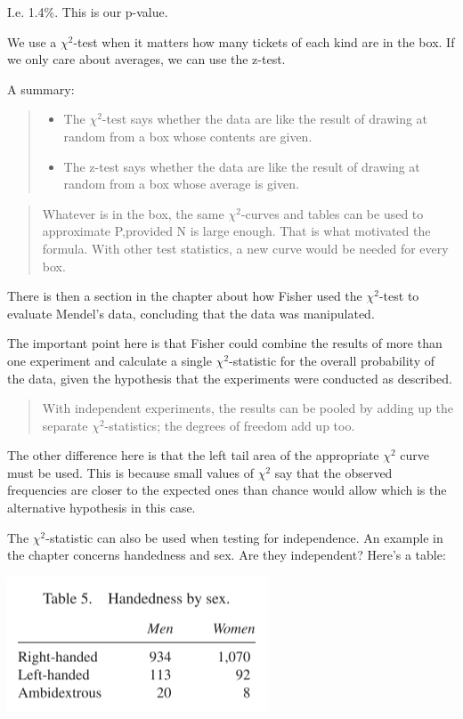 \documentclass[
]{book}
\providecommand{\tightlist}{%
  \setlength{\itemsep}{0pt}\setlength{\parskip}{0pt}}
\begin{document}
I.e. 1.4\%. This is our p-value.

We use a \(\chi^2\)-test when it matters how many tickets of each kind are in the box. If we only care about averages, we can use the z-test.

A summary:

\begin{quote}
\begin{itemize}
\tightlist
\item
  The \(\chi^2\)-test says whether the data are like the result of drawing at random from a box whose contents are given.
\item
  The z-test says whether the data are like the result of drawing at random from a box whose average is given.
\end{itemize}
\end{quote}

\begin{quote}
Whatever is in the box, the same \(\chi^2\)-curves and tables can be used to approximate P,provided N is large enough. That is what motivated the formula. With other test statistics, a new curve would be needed for every box.
\end{quote}

There is then a section in the chapter about how Fisher used the \(\chi^2\)-test to evaluate Mendel's data, concluding that the data was manipulated.

The important point here is that Fisher could combine the results of more than one experiment and calculate a single \(\chi^2\)-statistic for the overall probability of the data, given the hypothesis that the experiments were conducted as described.

\begin{quote}
With independent experiments, the results can be pooled by adding up the separate \(\chi^2\)-statistics; the degrees of freedom add up too.
\end{quote}

The other difference here is that the left tail area of the appropriate \(\chi^2\) curve must be used. This is because small values of \(\chi^2\) say that the observed frequencies are closer to the expected ones than chance would allow which is the alternative hypothesis in this case.

The \(\chi^2\)-statistic can also be used when testing for independence. An example in the chapter concerns handedness and sex. Are they independent? Here's a table:

\includegraphics{images/Ch28Img03.png}
\end{document}

